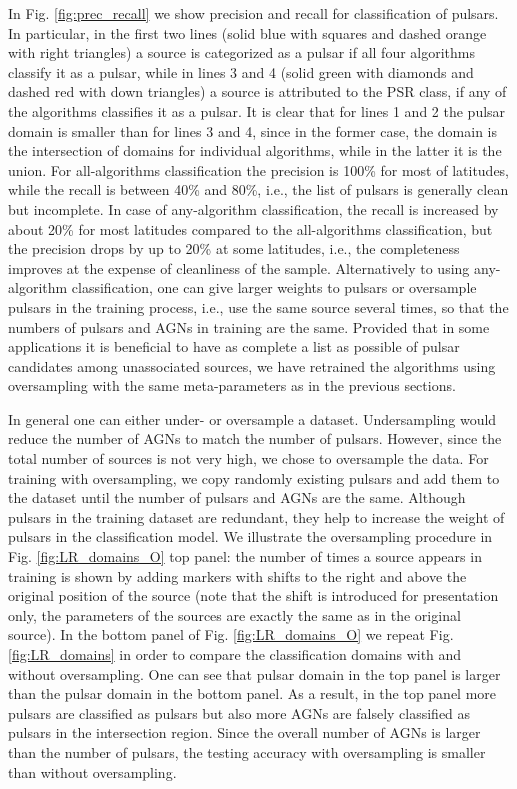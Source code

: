 \documentclass{aa}
\begin{document}
In Fig. \ref{fig:prec_recall} we show precision and recall for classification of pulsars.
In particular, in the first two lines (solid blue with squares and dashed orange with right triangles) a source is categorized as a pulsar if all four algorithms classify it as a pulsar,
while in lines 3 and 4 (solid green with diamonds and dashed red with down triangles) a source is attributed to the PSR class, if any of the algorithms classifies it as a pulsar.
It is clear that for lines 1 and 2 the pulsar domain is smaller than for lines 3 and 4, since in the former case, the domain is the intersection of domains for individual algorithms, while in the latter it is the union.
For all-algorithms classification the precision is 100\% for most of latitudes, while the recall is between 40\% and 80\%, i.e., the list of pulsars is generally clean but incomplete.
In case of any-algorithm classification, the recall is increased by about 20\% for most latitudes compared to the all-algorithms classification, but the precision drops by up to 20\% at some latitudes, i.e., the completeness improves at the expense of cleanliness of the sample.
Alternatively to using any-algorithm classification, one can give larger weights to pulsars or oversample pulsars in the training process, i.e., use the same source several times, so that the numbers of pulsars and AGNs in training are the same.
Provided that in some applications it is beneficial to have as complete a list as possible of pulsar candidates among unassociated sources, we have retrained the algorithms using oversampling with the same meta-parameters as in the previous sections.

In general one can either under- or oversample a dataset. Undersampling would reduce the number of AGNs to match the number of pulsars. However, since the total number of sources is not very high, we chose to oversample the data. 
For training with oversampling, we copy randomly existing pulsars and add them to the dataset until the number of pulsars and AGNs are the same.
Although pulsars in the training dataset are redundant, they help to increase the weight of pulsars in the classification model.
We illustrate the oversampling procedure in Fig. \ref{fig:LR_domains_O} top panel:
the number of times a source appears in training is shown by adding markers with shifts to the right and above the original position of the source (note that the shift is introduced for presentation only, the parameters of the sources are exactly the same as in the original source).
In the bottom panel of Fig. \ref{fig:LR_domains_O} we repeat Fig.  \ref{fig:LR_domains} in order to compare the classification domains with and without oversampling.
One can see that pulsar domain in the top panel is larger than the pulsar domain in the bottom panel.
As a result, in the top panel more pulsars are classified as pulsars but also more AGNs are falsely classified as pulsars in the intersection region. 
Since the overall number of AGNs is larger than the number of pulsars, the testing accuracy with oversampling is smaller than without oversampling.
\end{document}
